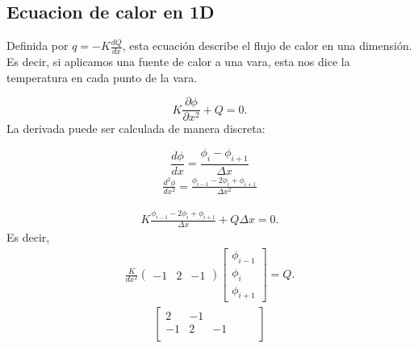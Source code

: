 \documentclass{article}
\theoremstyle{problemstyle}
\begin{document}
  \subsection{Ecuacion de calor en 1D}
  Definida por $ q = -K \frac{dQ}{dx} $, esta ecuaci\'on describe el flujo de calor en una dimensi\'on. Es decir, si aplicamos una fuente de calor a una vara, esta nos dice la temperatura en cada punto de la vara.
  
  \[
    K \frac{\partial \phi}{\partial x^2} + Q = 0.
  \]
  La derivada puede ser calculada de manera discreta:

  \[
    \frac{d\phi}{dx} = \frac{\phi_i-\phi_{i+1}}{\Delta x}
  \]
  \begin{align*}
    \frac{d^2\phi}{dx^2} = \frac{\phi_{i-1}-2\phi_{i}+\phi_{i+1}}{\Delta x^2}
  \end{align*}

  
  \begin{align*}
    K\frac{\phi_{i-1}-2\phi_{i}+\phi_{i+1}}{\Delta x} +Q\Delta x = 0.
  \end{align*}
  Es decir, 
  \begin{align*}
    \frac{K}{dx^2}\begin{pmatrix}
      -1 & 2 & -1
    \end{pmatrix}\begin{bmatrix}
    \phi_{i-1}\\
    \phi_{i}\\
    \phi_{i+1}
    \end{bmatrix} = Q.
  \end{align*}
   \begin{align*}
    \begin{bmatrix}
      2 & -1 & & & &\\
      -1 & 2 & -1 & & &\\
    \end{bmatrix}
   \end{align*}
  
  
\end{document}
